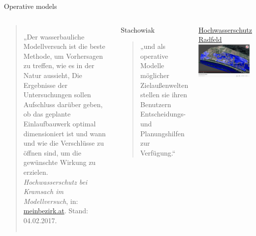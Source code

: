 \begin{frame}{Operative models}
  \begin{columns}%
    \begin{quote} „Der wasserbauliche Modellversuch ist die beste
Methode, um Vorhersagen zu treffen, wie es in der
Natur aussieht, \punkti Die Ergebnisse der Untersuchungen sollen Aufschluss
darüber geben, ob das geplante Einlaufbauwerk
optimal dimensioniert ist und wann und wie die
Verschlüsse zu öffnen sind, um die gewünschte Wirkung
zu erzielen. \\
{\scriptsize \emph{Hochwasserschutz bei Kramsach im Modellversuch}, in: \protect\url{meinbezirk.at}. Stand: 04.02.2017.}
    \end{quote}
        \begin{block}{Stachowiak}
        \begin{quote}
            „\punkti und als operative Modelle möglicher Zielaußenwelten stellen sie ihren Benutzern Entscheidungs- und Planungshilfen zur Verfügung.“~\parencite[139]{stachowiak}
        \end{quote}
    \end{block}
      \begin{block}{}
      \href{https://www.youtube.com/watch?v=TbtdXpJvZiA\&t=78s}{Hochwasserschutz Radfeld}
      \includegraphics[width=0.95\textwidth]{img/radfeld-hochwasserschutz.png}
      \end{block}

  \end{columns}
\end{frame}

